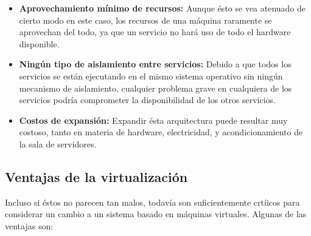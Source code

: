 \begin{itemize}
    \item \textbf{Aprovechamiento mínimo de recursos: }Aunque ésto se vea atenuado de cierto modo en este caso, los recursos de una máquina raramente se aprovechan del todo, ya que un servicio no hará uso de todo el hardware disponible.

    \item \textbf{Ningún tipo de aislamiento entre servicios: }Debido a que todos los servicios se están ejecutando en el mismo sistema operativo sin ningún mecanismo de aislamiento, cualquier problema grave en cualquiera de los servicios podría comprometer la disponibilidad de los otros servicios.

    \item \textbf{Costos de expansión: }Expandir ésta arquitectura puede resultar muy costoso, tanto en materia de hardware, electricidad, y acondicionamiento de la sala de servidores.
\end{itemize}

\subsection{Ventajas de la virtualización}
\label{subsec:virt_servers}
 
Incluso si éstos no parecen tan malos, todavía son suficientemente crtíicos para considerar un cambio a un sistema basado en máquinas virtuales. Algunas de las ventajas son:

